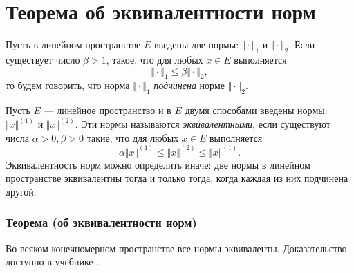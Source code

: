 \section{Теорема об эквивалентности норм}

Пусть в линейном пространстве $E$ введены две нормы: $\Vert \cdot \Vert_1$ и $\Vert \cdot \Vert_2$. Если существует число $\beta > 1$, такое, что для любых $x \in E$ выполняется
$$\Vert \cdot \Vert_1 \leqslant \beta \Vert \cdot \Vert_2,$$
то будем говорить, что норма $\Vert \cdot \Vert_1$ \textit{подчинена} норме $\Vert \cdot \Vert_2$.

Пусть $E$ --- линейное пространство и в $E$ двумя способами введены нормы: $\Vert x \Vert^{(1)}$ и $\Vert x \Vert^{(2)}$. Эти нормы называются \textit{эквивалентными}, если существуют числа $\alpha > 0, \beta > 0$ такие, что для любых $x \in E$ выполняется
$$\alpha\Vert x \Vert^{(1)} \leqslant \Vert x \Vert^{(2)} \leqslant \Vert x \Vert^{(1)}.$$
Эквивалентность норм можно определить иначе: две нормы в линейном пространстве эквивалентны тогда и только тогда, когда каждая из них подчинена другой.

\subsubsection*{Теорема (об эквивалентности норм)}
Во всяком конечномерном пространстве все нормы эквиваленты. Доказательство доступно в учебнике \cite[с.~28]{trenogin}.